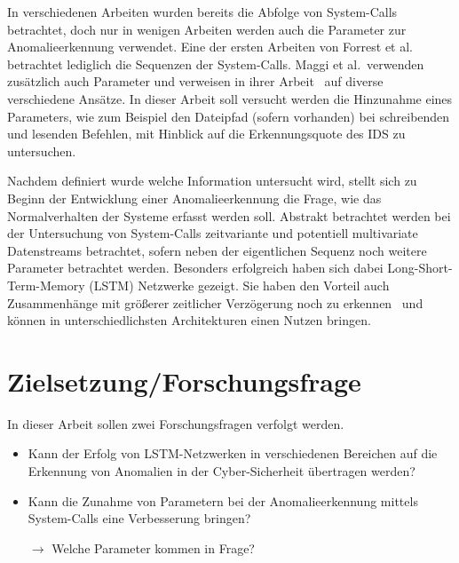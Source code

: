 In verschiedenen Arbeiten wurden bereits die Abfolge von System-Calls betrachtet, doch nur in wenigen Arbeiten werden auch die Parameter zur Anomalieerkennung verwendet. Eine der ersten Arbeiten von Forrest et al.~\cite{FORREST} betrachtet lediglich die Sequenzen der System-Calls.
Maggi et al.\ verwenden zusätzlich auch Parameter und verweisen in ihrer Arbeit~\cite{MAGGI} auf diverse verschiedene Ansätze.
In dieser Arbeit soll versucht werden die Hinzunahme eines Parameters, wie zum Beispiel den Dateipfad (sofern vorhanden) bei schreibenden und lesenden Befehlen, mit Hinblick auf die Erkennungsquote des \ac{IDS} zu untersuchen.

Nachdem definiert wurde welche Information untersucht wird, stellt sich zu Beginn der Entwicklung einer Anomalieerkennung die Frage, wie das Normalverhalten der Systeme erfasst werden soll.
Abstrakt betrachtet werden bei der Untersuchung von System-Calls zeitvariante und potentiell multivariate Datenstreams betrachtet, sofern neben der eigentlichen Sequenz noch weitere Parameter betrachtet werden.
Besonders erfolgreich haben sich dabei Long-Short-Term-Memory (LSTM) Netzwerke gezeigt.
Sie haben den Vorteil auch Zusammenhänge mit größerer zeitlicher Verzögerung noch zu erkennen~\cite{HOCHREITER} und können in unterschiedlichsten Architekturen einen Nutzen bringen. %

\section{Zielsetzung/Forschungsfrage}\label{sec:Forschungsfrage}

In dieser Arbeit sollen zwei Forschungsfragen verfolgt werden.
\begin{itemize}
    \item Kann der Erfolg von LSTM-Netzwerken in verschiedenen Bereichen auf die Erkennung von Anomalien in der Cyber-Sicherheit übertragen werden?
    \item Kann die Zunahme von Parametern bei der Anomalieerkennung mittels System-Calls eine Verbesserung bringen?

        $\rightarrow$ Welche Parameter kommen in Frage?
\end{itemize}

